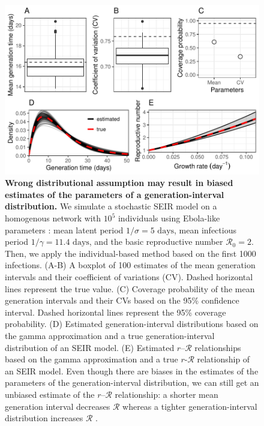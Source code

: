 \documentclass[12pt]{article}
\newcommand{\RR}{\ensuremath{{\mathcal R}}}
\begin{document}
\begin{figure}[!h]
\includegraphics[width=\textwidth]{../fig/full_coverage_fig.pdf}
\caption{\textbf{Wrong distributional assumption may result in biased estimates of the parameters of a generation-interval distribution.}
We simulate a stochastic SEIR model on a homogenous network with $10^5$ individuals using Ebola-like parameters \citep{who2014ebola}: mean latent period $1/\sigma = 5 \textrm{ days}$, mean infectious period $1/\gamma = 11.4 \textrm{ days}$, and the basic reproductive number $\RR_0 = 2$. Then, we apply the individual-based method based on the first 1000 infections.
(A-B) A boxplot of 100 estimates of the mean generation intervals and their coefficient of variations (CV). 
Dashed horizontal lines represent the true value.
(C) Coverage probability of the mean generation intervals and their CVs based on the 95\% confidence interval.
Dashed horizontal lines represent the 95\% coverage probability.
(D) Estimated generation-interval distributions based on the gamma approximation and a true generation-interval distribution of an SEIR model.
(E) Estimated $r$--$\RR$ relationships based on the gamma approximation and a true $r$-$\RR$ relationship of an SEIR model.
Even though there are biases in the estimates of the parameters of the generation-interval distribution, we can still get an unbiased estimate of the $r$--$\RR$ relationship: a shorter mean generation interval decreases $\RR$ whereas a tighter generation-interval distribution increases $\RR$ \citep{wallinga2007generation, park2019practical}.
}
\label{fig:cover}
\end{figure}

\pagebreak


\end{document}
